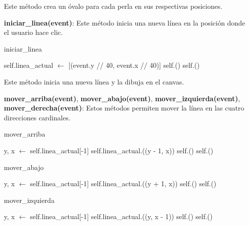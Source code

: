 \documentclass{article}
\begin{document}
Este método crea un óvalo para cada perla en sus respectivas posiciones.

\textbf{iniciar\_linea(event)}: Este método inicia una nueva línea en la posición donde el usuario hace clic.

\begin{algorithm}[H]
\caption{iniciar\_linea}
\begin{algorithmic}[1]
    \State self.linea\_actual $\leftarrow$ [(event.y // 40, event.x // 40)]
    \State self.()
    \State self.()
\EndProcedure
\end{algorithmic}
\end{algorithm}

Este método inicia una nueva línea y la dibuja en el canvas.

\textbf{mover\_arriba(event)}, \textbf{mover\_abajo(event)}, \textbf{mover\_izquierda(event)}, \textbf{mover\_derecha(event)}: Estos métodos permiten mover la línea en las cuatro direcciones cardinales.

\begin{algorithm}[H]
\caption{mover\_arriba}
\begin{algorithmic}[1]
        \State y, x $\leftarrow$ self.linea\_actual[-1]
            \State self.linea\_actual.((y - 1, x))
            \State self.()
            \State self.()
        \EndIf
    \EndIf
\EndProcedure
\end{algorithmic}
\end{algorithm}

\begin{algorithm}[H]
\caption{mover\_abajo}
\begin{algorithmic}[1]
        \State y, x $\leftarrow$ self.linea\_actual[-1]
            \State self.linea\_actual.((y + 1, x))
            \State self.()
            \State self.()
        \EndIf
    \EndIf
\EndProcedure
\end{algorithmic}
\end{algorithm}

\begin{algorithm}[H]
\caption{mover\_izquierda}
\begin{algorithmic}[1]
        \State y, x $\leftarrow$ self.linea\_actual[-1]
            \State self.linea\_actual.((y, x - 1))
            \State self.()
            \State self.()
        \EndIf
    \EndIf
\EndProcedure
\end{algorithmic}
\end{algorithm}
\end{document}
